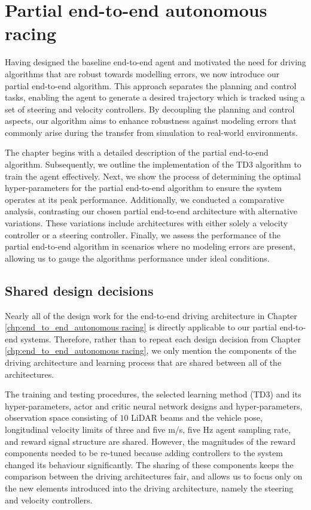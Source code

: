 \chapter{Partial end-to-end autonomous racing}
\label{chp:partial_end_to_end_autonomous_racing}

Having designed the baseline end-to-end agent and motivated the need for driving algorithms that are robust towards modelling errors, we now introduce our partial end-to-end algorithm.
This approach separates the planning and control tasks, enabling the agent to generate a desired trajectory which is tracked using a set of steering and velocity controllers.
By decoupling the planning and control aspects, our algorithm aims to enhance robustness against modeling errors that commonly arise during the transfer from simulation to real-world environments.

The chapter begins with a detailed description of the partial end-to-end algorithm.
Subsequently, we outline the implementation of the TD3 algorithm to train the agent effectively.
Next, we show the process of determining the optimal hyper-parameters for the partial end-to-end algorithm to ensure the system operates at its peak performance. 
Additionally, we conducted a comparative analysis, contrasting our chosen partial end-to-end architecture with alternative variations. 
These variations include architectures with either solely a velocity controller or a steering controller. 
Finally, we assess the performance of the partial end-to-end algorithm in scenarios where no modeling errors are present, allowing us to gauge the algorithms performance under ideal conditions. 



\section{Shared design decisions}
Nearly all of the design work for the end-to-end driving architecture in Chapter \ref{chp:end_to_end_autonomous racing} is directly applicable to our partial end-to-end systems. 
Therefore, rather than to repeat each design decision from Chapter \ref{chp:end_to_end_autonomous racing}, we only mention the components of the driving architecture and learning process that are shared between all of the architectures.

The training and testing procedures, the selected learning method (TD3) and its hyper-parameters, actor and critic neural network designs and hyper-parameters, observation space consisting of $10$ LiDAR beams and the vehicle pose, longitudinal velocity limits of three and five m/s, five Hz agent sampling rate, and reward signal structure are shared.
However, the magnitudes of the reward components needed to be re-tuned because adding controllers to the system changed its behaviour significantly.
The sharing of these components keeps the comparison between the driving architectures fair, and allows us to focus only on the new elements introduced into the driving architecture, namely the steering and velocity controllers.


